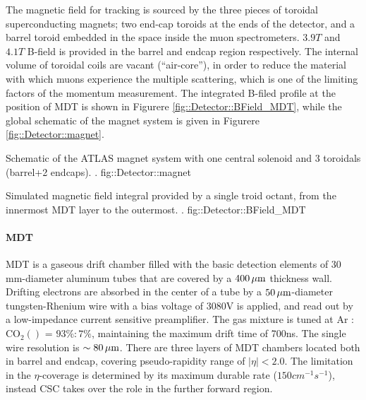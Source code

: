 The magnetic field for tracking is sourced by the three pieces of toroidal superconducting magnets; two end-cap toroids at the ends of the detector, and a barrel toroid embedded in the space inside the muon spectrometers. $3.9T$ and $4.1T$ B-field is provided in the barrel and endcap region respectively. The internal volume of toroidal coils are vacant (``air-core''), in order to reduce the material with which muons experience the multiple scattering, which is one of the limiting factors of the momentum measurement. The integrated B-filed profile at the position of MDT is shown in Figurere \ref{fig::Detector::BField_MDT}, while the global schematic of the magnet system is given in Figurere \ref{fig::Detector::magnet}.

{Schematic of the ATLAS magnet system with one central solenoid and 3 toroidals (barrel+2 endcaps). \cite{ATLAS_exp}.}
{fig::Detector::magnet}


{ Simulated magnetic field integral provided by a single troid octant, from the innermost MDT layer to the outermost. \cite{ATLAS_exp}.}
{fig::Detector::BField_MDT}





\paragraph{MDT}
MDT is a gaseous drift chamber filled with the basic detection elements of 30 mm-diameter aluminum tubes that are covered by a $400 \, \mathrm{\mu m}$ thickness wall. 
Drifting electrons are absorbed in the center of a tube by a $50 \, \mathrm{\mu m}$-diameter tungsten-Rhenium wire with a bias voltage of 3080V is applied, and read out by a low-impedance current sensitive preamplifier.
The gas mixture is tuned at Ar : $\mathrm{CO_2} ()$ = $93\%:7\%$, maintaining the maximum drift time of 700ns. The single wire resolution is $\sim 80 \, \mathrm{\mu m}$.
There are three layers of MDT chambers located both in barrel and endcap, covering pseudo-rapidity range of $|\eta|<2.0$.
The limitation in the $\eta$-coverage is determined by its maximum durable rate ($150 cm^{-1}s^{-1}$), instead CSC takes over the role in the further forward region.


